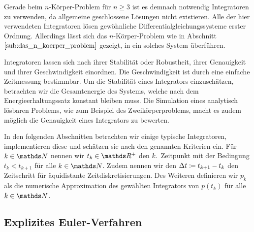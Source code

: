     Gerade beim $n$-Körper-Problem für $n\geq 3$ ist es demnach notwendig Integratoren zu verwenden, da allgemeine geschlossene Lösungen nicht existieren.
    Alle der hier verwendeten Integratoren lösen gewöhnliche Differentialgleichungssysteme erster Ordnung.
    Allerdings lässt sich das $n$-Körper-Problem wie in Abschnitt $\ref{sub:das_n_koerper_problem}$ gezeigt, in ein solches System überführen.

    Integratoren lassen sich nach ihrer Stabilität oder Robustheit, ihrer Genauigkeit und ihrer Geschwindigkeit einordnen.
    Die Geschwindigkeit ist durch eine einfache Zeitmessung bestimmbar.
    Um die Stabilität eines Integrators einzuschätzen, betrachten wir die Gesamtenergie des Systems, welche nach dem Energieerhaltungssatz konstant bleiben muss.
    Die Simulation eines analytisch lösbaren Problems, wie zum Beispiel des Zweikörperproblems, macht es zudem möglich die Genauigkeit eines Integrators zu bewerten.

    In den folgenden Abschnitten betrachten wir einige typische Integratoren, implementieren diese und schätzen sie nach den genannten Kriterien ein.
    Für $k\in\setNatural$ nennen wir $t_k\in\setReal^+$ den $k$.~Zeitpunkt mit der Bedingung $t_k < t_{k+1}$ für alle $k\in\setNatural$.
    Zudem nennen wir den $\Delta t \coloneqq t_{k+1}-t_k$ den Zeitschritt für äquidistante Zeitdiskretisierungen.
    Des Weiteren definieren wir $p_k$ als die numerische Approximation des gewählten Integrators von $p(t_k)$ für alle $k\in\setNatural$.


  \subsection{Explizites Euler-Verfahren} %
  \label{sub:euler_verfahren}

